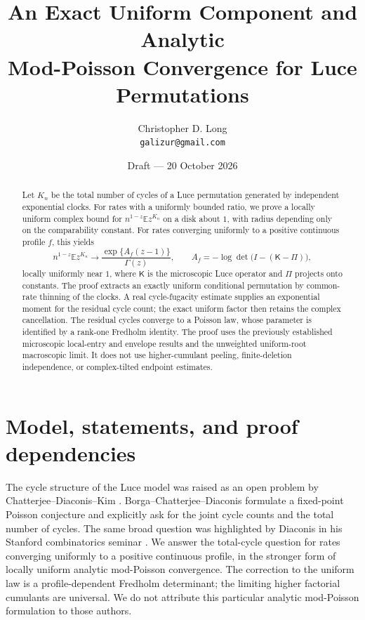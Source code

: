 \documentclass[11pt]{article}
\title{An Exact Uniform Component and Analytic\\Mod-Poisson Convergence for Luce Permutations}
\author{Christopher D. Long\\\texttt{galizur@gmail.com}}
\date{Draft --- 20 October 2026}
\numberwithin{equation}{section}
\theoremstyle{definition}
\theoremstyle{remark}
\newcommand{\E}{\mathbb E}
\newcommand{\Kop}{\mathsf K}
\begin{document}
\maketitle
\begin{abstract}
Let $K_n$ be the total number of cycles of a Luce permutation generated by independent exponential clocks. For rates with a uniformly bounded ratio, we prove a locally uniform complex bound for $n^{1-z}\E z^{K_n}$ on a disk about $1$, with radius depending only on the comparability constant. For rates converging uniformly to a positive continuous profile $f$, this yields
\[
 n^{1-z}\E z^{K_n}\longrightarrow
 \frac{\exp\{A_f(z-1)\}}{\Gamma(z)},
 \qquad
 A_f=-\log\det\bigl(I-(\Kop-\Pi)\bigr),
\]
locally uniformly near $1$, where $\Kop$ is the microscopic Luce operator and $\Pi$ projects onto constants. The proof extracts an exactly uniform conditional permutation by common-rate thinning of the clocks. A real cycle-fugacity estimate supplies an exponential moment for the residual cycle count; the exact uniform factor then retains the complex cancellation. The residual cycles converge to a Poisson law, whose parameter is identified by a rank-one Fredholm identity. The proof uses the previously established microscopic local-entry and envelope results and the unweighted uniform-root macroscopic limit. It does not use higher-cumulant peeling, finite-deletion independence, or complex-tilted endpoint estimates.
\end{abstract}

\setcounter{tocdepth}{1}
\tableofcontents
\newpage
\raggedbottom

\section{Model, statements, and proof dependencies}\label{sec:introduction}

The cycle structure of the Luce model was raised as an open problem by
Chatterjee--Diaconis--Kim \cite[Section~1]{CDK}. Borga--Chatterjee--Diaconis
\cite[Section~5.2]{BCD} formulate a fixed-point Poisson conjecture and explicitly
ask for the joint cycle counts and the total number of cycles. The same broad
question was highlighted by Diaconis in his Stanford combinatorics seminar
\cite{DiaconisSeminar}. We answer the total-cycle question for rates converging
uniformly to a positive continuous profile, in the stronger form of locally
uniform analytic mod-Poisson convergence. The correction to the uniform law is
a profile-dependent Fredholm determinant; the limiting higher factorial
cumulants are universal. We do not attribute this particular analytic
mod-Poisson formulation to those authors.
\end{document}
